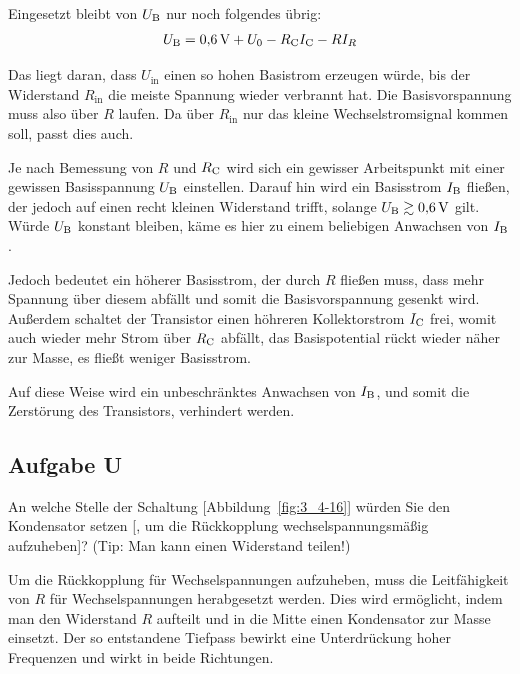 Eingesetzt bleibt von $U_\text{B}$ nur noch folgendes übrig:
\[
    U_\text{B} = \SI{.6}\volt + U_0 - R_\text{C} I_\text{C} - R I_R
\]

Das liegt daran, dass $U_\text{in}$ einen so hohen Basistrom erzeugen würde,
bis der Widerstand $R_\text{in}$ die meiste Spannung wieder verbrannt hat. Die
Basisvorspannung muss also über $R$ laufen. Da über $R_\text{in}$ nur das
kleine Wechselstromsignal kommen soll, passt dies auch.

Je nach Bemessung von $R$ und $R_\text{C}$ wird sich ein gewisser Arbeitspunkt mit
einer gewissen Basisspannung $U_\text{B}$ einstellen. Darauf hin wird ein Basisstrom
$I_\text{B}$ fließen, der jedoch auf einen recht kleinen Widerstand trifft, solange
$U_\text{B} \gtrsim \SI{.6}\volt$ gilt. Würde $U_\text{B}$ konstant bleiben, käme es hier zu
einem beliebigen Anwachsen von $I_\text{B}$.

Jedoch bedeutet ein höherer Basisstrom, der durch $R$ fließen muss, dass mehr
Spannung über diesem abfällt und somit die Basisvorspannung gesenkt wird.
Außerdem schaltet der Transistor einen höhreren Kollektorstrom $I_\text{C}$ frei,
womit auch wieder mehr Strom über $R_\text{C}$ abfällt, das Basispotential rückt
wieder näher zur Masse, es fließt weniger Basisstrom.

Auf diese Weise wird ein unbeschränktes Anwachsen von $I_\text{B}$, und somit die
Zerstörung des Transistors, verhindert werden.

\FloatBarrier
\subsection{Aufgabe U}

\begin{problem}
    An welche Stelle der Schaltung [Abbildung~\ref{fig:3_4-16}] würden Sie den
    Kondensator setzen [, um die Rückkopplung wechselspannungsmäßig
    aufzuheben]? (Tip: Man kann einen Widerstand teilen!)
\end{problem}

Um die Rückkopplung für Wechselspannungen aufzuheben, muss die Leitfähigkeit
von $R$ für Wechselspannungen herabgesetzt werden. Dies wird ermöglicht, indem
man den Widerstand $R$ aufteilt und in die Mitte einen Kondensator zur Masse
einsetzt. Der so entstandene Tiefpass bewirkt eine Unterdrückung hoher
Frequenzen und wirkt in beide Richtungen.


